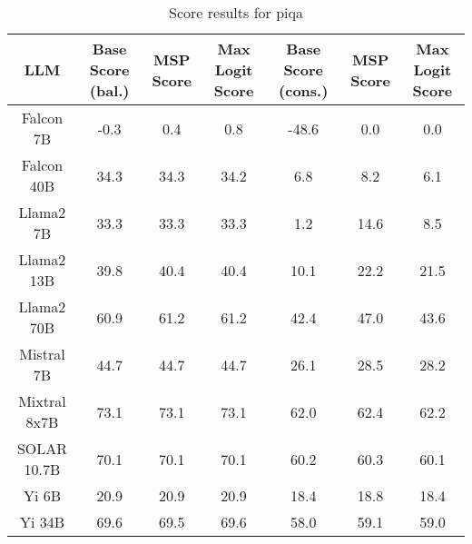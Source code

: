 \renewcommand\arraystretch{1.2}
\begin{table*}
\centering
\begin{tabular}{c|c|c|c|c|c|c}
LLM & Base Score (bal.) & MSP Score & Max Logit Score & Base Score (cons.) & MSP Score & Max Logit Score\\ \hline
Falcon 7B & -0.3 & 0.4 & 0.8 & -48.6 & 0.0 & 0.0\\
Falcon 40B & 34.3 & 34.3 & 34.2 & 6.8 & 8.2 & 6.1\\
Llama2 7B & 33.3 & 33.3 & 33.3 & 1.2 & 14.6 & 8.5\\
Llama2 13B & 39.8 & 40.4 & 40.4 & 10.1 & 22.2 & 21.5\\
Llama2 70B & 60.9 & 61.2 & 61.2 & 42.4 & 47.0 & 43.6\\
Mistral 7B & 44.7 & 44.7 & 44.7 & 26.1 & 28.5 & 28.2\\
Mixtral 8x7B & 73.1 & 73.1 & 73.1 & 62.0 & 62.4 & 62.2\\
SOLAR 10.7B & 70.1 & 70.1 & 70.1 & 60.2 & 60.3 & 60.1\\
Yi 6B & 20.9 & 20.9 & 20.9 & 18.4 & 18.8 & 18.4\\
Yi 34B & 69.6 & 69.5 & 69.6 & 58.0 & 59.1 & 59.0\\
\hline
\end{tabular}
\caption{Score results for piqa}
\end{table*}
\label{tab:piqa_score}
